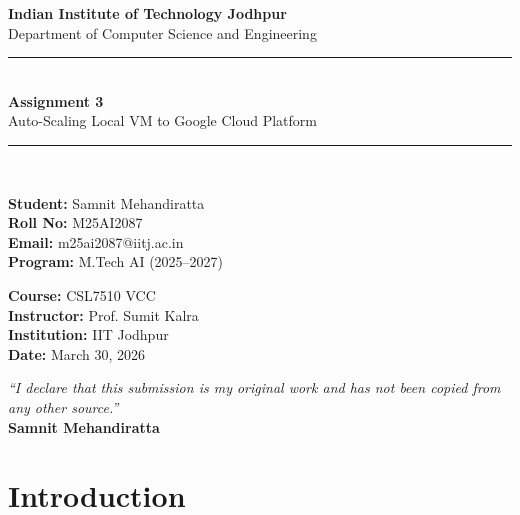 \documentclass[12pt,a4paper]{article}
\begin{document}
\begin{titlepage}
    \centering
    \vspace*{2cm}
    {\LARGE\bfseries Indian Institute of Technology Jodhpur\\}
    \vspace{0.5cm}
    {\large Department of Computer Science and Engineering\\}
    \vspace{2cm}
    \rule{\linewidth}{0.5mm}\\[0.4cm]
    {\huge\bfseries Assignment 3\\}
    \vspace{0.3cm}
    {\Large Auto-Scaling Local VM to Google Cloud Platform\\}
    \rule{\linewidth}{0.5mm}\\[1.5cm]

    \begin{minipage}{0.45\textwidth}
        \begin{flushleft}
        \textbf{Student:} Samnit Mehandiratta\\
        \textbf{Roll No:} M25AI2087\\
        \textbf{Email:} m25ai2087@iitj.ac.in\\
        \textbf{Program:} M.Tech AI (2025--2027)
        \end{flushleft}
    \end{minipage}
    \begin{minipage}{0.45\textwidth}
        \begin{flushright}
        \textbf{Course:} CSL7510 VCC\\
        \textbf{Instructor:} Prof. Sumit Kalra\\
        \textbf{Institution:} IIT Jodhpur\\
        \textbf{Date:} March 30, 2026
        \end{flushright}
    \end{minipage}
    \vfill
    {\large\textit{``I declare that this submission is my original work and has not been copied from any other source.''}}\\
    \vspace{0.5cm}
    \textbf{Samnit Mehandiratta}
\end{titlepage}

\tableofcontents
\newpage

\section{Introduction}
\end{document}
